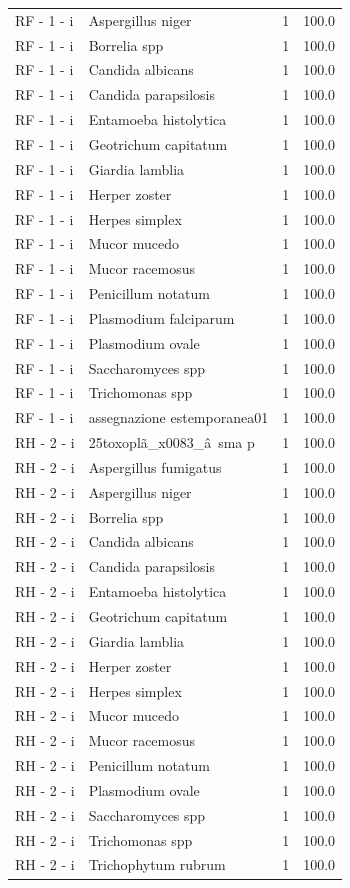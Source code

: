 \documentclass[a4paper,11pt]{article}
\begin{document}
\begin{footnotesize}
\begin{longtable}{p{3.5cm}p{7.5cm}rr}
RF - 1 - i & Aspergillus niger & 1 & 100.0 \\
RF - 1 - i & Borrelia spp & 1 & 100.0 \\
RF - 1 - i & Candida albicans & 1 & 100.0 \\
RF - 1 - i & Candida parapsilosis & 1 & 100.0 \\
RF - 1 - i & Entamoeba histolytica & 1 & 100.0 \\
RF - 1 - i & Geotrichum capitatum & 1 & 100.0 \\
RF - 1 - i & Giardia lamblia & 1 & 100.0 \\
RF - 1 - i & Herper zoster & 1 & 100.0 \\
RF - 1 - i & Herpes simplex & 1 & 100.0 \\
RF - 1 - i & Mucor mucedo & 1 & 100.0 \\
RF - 1 - i & Mucor racemosus & 1 & 100.0 \\
RF - 1 - i & Penicillum notatum & 1 & 100.0 \\
RF - 1 - i & Plasmodium falciparum & 1 & 100.0 \\
RF - 1 - i & Plasmodium ovale & 1 & 100.0 \\
RF - 1 - i & Saccharomyces spp & 1 & 100.0 \\
RF - 1 - i & Trichomonas spp & 1 & 100.0 \\
RF - 1 - i & assegnazione estemporanea01 & 1 & 100.0 \\
RH - 2 - i & 25toxoplã\_x0083\_â sma p & 1 & 100.0 \\
RH - 2 - i & Aspergillus fumigatus & 1 & 100.0 \\
RH - 2 - i & Aspergillus niger & 1 & 100.0 \\
RH - 2 - i & Borrelia spp & 1 & 100.0 \\
RH - 2 - i & Candida albicans & 1 & 100.0 \\
RH - 2 - i & Candida parapsilosis & 1 & 100.0 \\
RH - 2 - i & Entamoeba histolytica & 1 & 100.0 \\
RH - 2 - i & Geotrichum capitatum & 1 & 100.0 \\
RH - 2 - i & Giardia lamblia & 1 & 100.0 \\
RH - 2 - i & Herper zoster & 1 & 100.0 \\
RH - 2 - i & Herpes simplex & 1 & 100.0 \\
RH - 2 - i & Mucor mucedo & 1 & 100.0 \\
RH - 2 - i & Mucor racemosus & 1 & 100.0 \\
RH - 2 - i & Penicillum notatum & 1 & 100.0 \\
RH - 2 - i & Plasmodium ovale & 1 & 100.0 \\
RH - 2 - i & Saccharomyces spp & 1 & 100.0 \\
RH - 2 - i & Trichomonas spp & 1 & 100.0 \\
RH - 2 - i & Trichophytum rubrum & 1 & 100.0 \\
\end{longtable}
\end{footnotesize}
\end{document}
